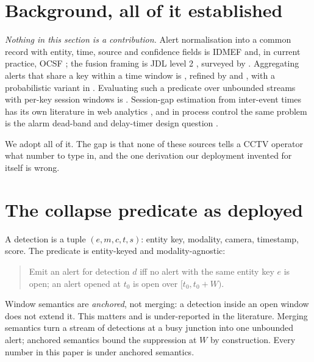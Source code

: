 \documentclass[11pt,a4paper]{article}
\begin{document}
\section{Background, all of it established}
\label{sec:bg}

\emph{Nothing in this section is a contribution.} Alert normalisation into a
common record with entity, time, source and confidence fields is IDMEF
\citep{idmef2007} and, in current practice, OCSF \citep{ocsf}; the fusion framing
is JDL level 2 \citep{steinberg1999jdl}, surveyed by
\citet{khaleghi2013multisensor}. Aggregating alerts that share a key within a
time window is \citet{debar2001aggregation}, refined by
\citet{julisch2003clustering} and \citet{ning2002constructing}, with a
probabilistic variant in \citet{valdes2001probabilistic}. Evaluating such a
predicate over unbounded streams with per-key session windows is
\citet{akidau2015dataflow}. Session-gap estimation from inter-event times has its
own literature in web analytics \citep{catledge1995characterizing,
halfaker2015session, meiss2009session}, and in process control the same problem is
the alarm dead-band and delay-timer design question
\citep{adnan2011detectiondelay, afzal2018timedeadbands, wang2022delaytimers}.

We adopt all of it. The gap is that none of these sources tells a CCTV operator
what number to type in, and the one derivation our deployment invented for itself
is wrong.

\section{The collapse predicate as deployed}

A detection is a tuple $(e, m, c, t, s)$: entity key, modality, camera, timestamp,
score. The predicate is entity-keyed and modality-agnostic:

\begin{quote}
Emit an alert for detection $d$ iff no alert with the same entity key $e$ is open;
an alert opened at $t_0$ is open over $[t_0, t_0 + W)$.
\end{quote}

Window semantics are \emph{anchored}, not merging: a detection inside an open
window does not extend it. This matters and is under-reported in the literature.
Merging semantics turn a stream of detections at a busy junction into one
unbounded alert; anchored semantics bound the suppression at $W$ by construction.
Every number in this paper is under anchored semantics.
\end{document}
